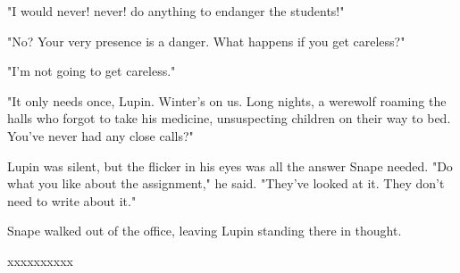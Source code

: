 \documentclass[a4paper,11pt]{article}
\begin{document}
"I would never! never! do anything to endanger the students!"

"No? Your very presence is a danger. What happens if you get careless?"

"I'm not going to get careless."

"It only needs once, Lupin. Winter's on us. Long nights, a werewolf roaming the halls who forgot to take his medicine, unsuspecting children on their way to bed. You've never had any close calls?"

Lupin was silent, but the flicker in his eyes was all the answer Snape needed. "Do what you like about the assignment," he said. "They've looked at it. They don't need to write about it."

Snape walked out of the office, leaving Lupin standing there in thought.

xxxxxxxxxx
\end{document}
